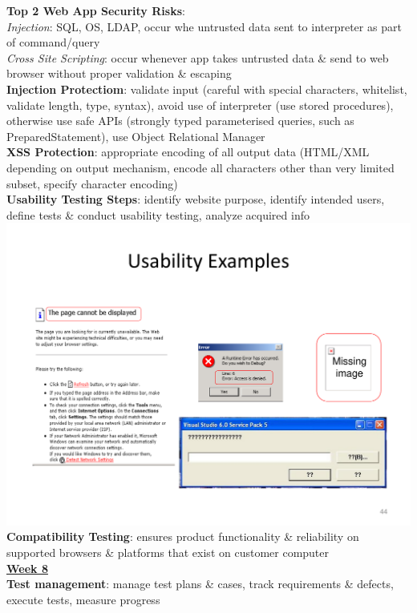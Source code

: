 \documentclass[a4paper]{article}
\begin{document}
\begin{multicols}{3}
        \textbf{Top 2 Web App Security Risks}:\\
        \textit{Injection}: SQL, OS, LDAP, occur whe untrusted data sent to interpreter as part of command/query\\
        \textit{Cross Site Scripting}: occur whenever app takes untrusted data \& send to web browser without proper validation \& escaping\\
        \textbf{Injection Protectiom}: validate input (careful with special characters, whitelist, validate length, type, syntax), avoid use of interpreter (use stored procedures), otherwise use safe APIs (strongly typed parameterised queries, such as PreparedStatement), use Object Relational Manager\\
        \textbf{XSS Protection}: appropriate encoding of all output data (HTML/XML depending on output mechanism, encode all characters other than very limited subset, specify character encoding)\\
        \textbf{Usability Testing Steps}: identify website purpose, identify intended users, define tests \& conduct usability testing, analyze acquired info\\
        \includegraphics[width=\linewidth]{340.pdf}\\
        \textbf{Compatibility Testing}: ensures product functionality \& reliability on supported browsers \& platforms that exist on customer computer\\
        \vfill\null\columnbreak\noindent\underline{\textbf{Week 8}}\\
        \textbf{Test management}: manage test plans \& cases, track requirements \& defects, execute tests, measure progress\\

\end{multicols}
\end{document}
